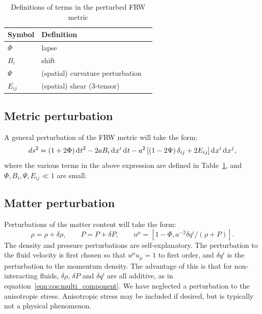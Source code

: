 \begin{table}
  \centering
\begin{tabular}{lll}
 \toprule
  Symbol & Definition \\
 \midrule
 \midrule
 $\Phi$ & lapse \\
 $B_i$ & shift \\
 $\Psi$ & (spatial) curvature perturbation  \\
 $E_{ij}$ & (spatial) shear (3-tensor) \\
 \bottomrule
\end{tabular}
\caption{Definitions of terms in the perturbed FRW metric}\label{tab:cos:perturbed_metric}
\end{table}


\subsection{Metric perturbation}
A general perturbation of the FRW metric will take the form:
\begin{equation}
  ds^2 = (1+2\Phi)\operatorname{d}^{}\!{t}^2 -2a B_i \operatorname{d}^{}\!{x}^i \operatorname{d}^{}\!{t}  -a^2 \left[ \left( 1 - 2 \Psi \right)\delta_{ij} + 2E_{ij} \right] \operatorname{d}^{}\!{x}^i \operatorname{d}^{}\!{x}^j,
  \label{eqn:cos:FRW_perturb}
\end{equation}
where the various terms in the above expression are defined in Table~\ref{tab:cos:perturbed_metric}, and ${\Phi,B_i,\Psi,E_{ij}\ll1}$ are small. 

\subsection{Matter perturbation}
Perturbations of the matter content will take the form:
\begin{equation}
  \rho = \rho + \delta \rho, \qquad 
  P = P + \delta P, \qquad
  u^\mu = \left[ 1-\Phi, a^{-2} \delta q^i/(\rho+P)\right].
  \label{eqn:cos:matter_perturb}
\end{equation}
The density and pressure perturbations are self-explanatory. The perturbation to the fluid velocity is first chosen so that $u^\mu u_\mu=1$ to first order, and $\delta q^i$ is the perturbation to the momentum density. The advantage of this is that for non-interacting fluids, $\delta\rho$, $\delta P$ and $\delta q^i$ are all additive, as in equation~\eqref{eqn:cos:multi_component}. We have neglected a perturbation to the anisotropic stress. Anisotropic stress may be included if desired, but is typically not a physical phenomenon. 


